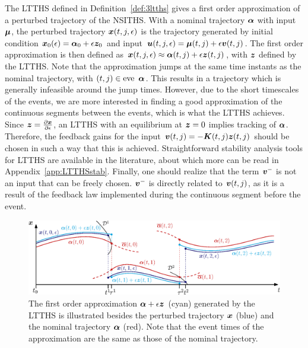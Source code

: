 \documentclass[../DC2017114Bouma.tex]{subfiles}
\begin{document}
The LTTHS defined in Definition~\ref{def:3ltths} gives a first order approximation of a perturbed trajectory of the NSITHS. With a nominal trajectory $\boldsymbol{\alpha}$ with input $\boldsymbol{\mu}$, the perturbed trajectory ${\boldsymbol{x}}(t,j,\epsilon)$ is the trajectory generated by initial condition ${\boldsymbol{x}}_0(\epsilon) = \boldsymbol{\alpha}_0 + \epsilon{\boldsymbol{z}}_0$ and input ${\boldsymbol{u}}(t,j,\epsilon) = \boldsymbol{\mu}(t,j) + \epsilon{\boldsymbol{v}}(t,j)$. The first order approximation is then defined as ${\boldsymbol{x}}(t,j,\epsilon) \approx \boldsymbol{\alpha}(t,j) + \epsilon{\boldsymbol{z}}(t,j)$, with ${\boldsymbol{z}}$ defined by the LTTHS. Note that the approximation jumps at the same time instants as the nominal trajectory, with $(t,j) \in \operatorname{\textnormal{eve}}\ \boldsymbol{\alpha}$. This results in a trajectory which is generally infeasible around the jump times. However, due to the short timescales of the events, we are more interested in finding a good approximation of the continuous segments between the events, which is what the LTTHS achieves. Since ${\boldsymbol{z}} = \frac{\partial{\boldsymbol{x}}}{\partial\epsilon}$, an LTTHS with an equilibrium at ${\boldsymbol{z}} = 0$ implies tracking of $\boldsymbol{\alpha}$. Therefore, the feedback gains for the input ${\boldsymbol{v}}(t,j) = -{\boldsymbol{K}}(t,j){\boldsymbol{z}}(t,j)$ should be chosen in such a way that this is achieved. Straightforward stability analysis tools for LTTHS are available in the literature, about which more can be read in Appendix~\ref{app:LTTHSstab}. Finally, one should realize that the term ${\boldsymbol{v}}^-$ is not an input that can be freely chosen. ${\boldsymbol{v}}^-$ is directly related to ${\boldsymbol{v}}(t,j)$, as it is a result of the feedback law implemented during the continuous segment before the event.

\begin{figure}[h]
\centering
\includegraphics[width=.95\textwidth]{refspreadapprox.eps}\caption{The first order approximation $\boldsymbol{\alpha} + \epsilon{\boldsymbol{z}}$ (cyan) generated by the LTTHS is illustrated besides the perturbed trajectory ${\boldsymbol{x}}$ (blue) and the nominal trajectory $\boldsymbol{\alpha}$ (red). Note that the event times of the approximation are the same as those of the nominal trajectory.} \label{fig:3refspreadapprox}
\end{figure}
\end{document}
